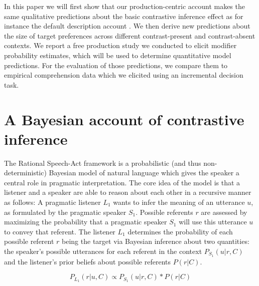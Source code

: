 \documentclass[10pt,letterpaper]{article}
\newcommand{\ek}[1]{\textcolor{Orange}{[ek: #1]}}
\begin{document}
In this paper we will first show that our production-centric account makes the same qualitative predictions about the basic contrastive inference effect as for instance the default description account \cite{Sedivy:2003}. We then derive new predictions about the size of target preferences across different contrast-present and contrast-absent contexts. We report a free production study we conducted to elicit modifier probability estimates, which will be used to determine quantitative model predictions. For the evaluation of those predictions, we compare them to empirical comprehension data which we elicited using an incremental decision task.


\section{A Bayesian account of contrastive inference}


The Rational Speech-Act framework \cite{Frank:2012,Goodman:2016} is a probabilistic (and thus non-deterministic) Bayesian model of natural language which gives the speaker a central role in pragmatic interpretation. The core idea of the model is that a listener and a speaker are able to reason about each other in a recursive manner as follows: A pragmatic listener $L_1$ wants to infer the meaning of an utterance $u$, as formulated by the pragmatic speaker $S_1$. Possible referents $r$ are assessed by maximizing the probability that a pragmatic speaker $S_1$ will use this utterance $u$ to convey that referent.
The listener $L_1$ determines the probability of each possible referent $r$ being the target via Bayesian inference about two quantities: the speaker's possible utterances for each referent in the context $P_{S_1}(u|r,C)$ and the listener's prior beliefs about possible referents $P(r|C)$. 

\begin{equation}
	P_{L_1}(r|u,C) \propto P_{S_1}(u|r,C) * P(r|C)
\label{eq-prior}
\end{equation}
\end{document}
